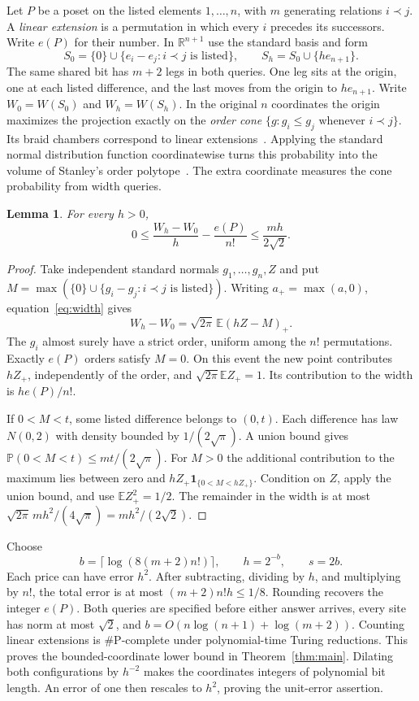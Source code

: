 \documentclass[11pt,letterpaper]{article}
\newtheorem{lemma}[theorem]{Lemma}
\theoremstyle{definition}
\newcommand{\E}{\mathbb E}
\newcommand{\R}{\mathbb R}
\newcommand{\Prob}{\mathbb P}
\newcommand{\sharpP}{\#\mathrm P}
\begin{document}
Let \(P\) be a poset on the listed elements \(1,\ldots,n\), with \(m\)
generating relations \(i\prec j\). A \emph{linear extension} is a permutation
in which every \(i\) precedes its successors. Write \(e(P)\) for their number.
In \(\R^{n+1}\) use the standard basis and form
\[
 S_0=\{0\}\cup\{e_i-e_j:i\prec j\text{ is listed}\},\qquad
 S_h=S_0\cup\{h e_{n+1}\}.
\]
The same shared bit has \(m+2\) legs in both queries. One leg sits at the
origin, one at each listed difference, and the last moves from the origin
to \(he_{n+1}\). Write \(W_0=W(S_0)\) and \(W_h=W(S_h)\).
In the original \(n\) coordinates the origin maximizes the projection
exactly on the \emph{order cone} \(\{g:g_i\le g_j\text{ whenever }i\prec j\}\).
Its braid chambers correspond to linear extensions~\cite[Section~2.4]{dbkr-poset-cones}. Applying the standard normal distribution function coordinatewise turns this probability into the volume of Stanley's order polytope~\cite[Corollary~4.2]{stanley-poset-polytopes}. The extra coordinate measures the cone probability from width queries.

\begin{lemma}\label{lem:lift}
For every \(h>0\),
\[
 0\le \frac{W_h-W_0}{h}-\frac{e(P)}{n!}\le \frac{mh}{2\sqrt2}.
\]
\end{lemma}
\begin{proof}
Take independent standard normals \(g_1,\ldots,g_n,Z\) and put
\(M=\max(\{0\}\cup\{g_i-g_j:i\prec j\text{ is listed}\})\).
Writing \(a_+=\max(a,0)\), equation~\eqref{eq:width} gives
\[
 W_h-W_0=\sqrt{2\pi}\,\E(hZ-M)_+ .
\]
The \(g_i\) almost surely have a strict order, uniform among the \(n!\)
permutations. Exactly \(e(P)\) orders satisfy \(M=0\). On this event the
new point contributes \(hZ_+\), independently of the order, and
\(\sqrt{2\pi}\E Z_+=1\). Its contribution to the width is \(h e(P)/n!\).

If \(0<M<t\), some listed difference belongs to \((0,t)\).
Each difference has law \(N(0,2)\) with density bounded by
\(1/(2\sqrt\pi)\). A union bound gives
\(\Prob(0<M<t)\le mt/(2\sqrt\pi)\). For \(M>0\) the additional contribution
to the maximum lies between zero and
\(hZ_+\mathbf1_{\{0<M<hZ_+\}}\). Condition on \(Z\), apply the union
bound, and use \(\E Z_+^2=1/2\). The remainder in the width is at most
\(\sqrt{2\pi}\,mh^2/(4\sqrt\pi)=mh^2/(2\sqrt2)\).
\end{proof}

Choose
\[
 b=\lceil\log(8(m+2)n!)\rceil,\qquad h=2^{-b},\qquad s=2b .
\]
Each price can have error \(h^2\). After subtracting, dividing by \(h\),
and multiplying by \(n!\), the total error is at most
\((m+2)n!h\le1/8\). Rounding recovers the integer \(e(P)\). Both queries
are specified before either answer arrives, every site has norm at most
\(\sqrt2\), and \(b=O(n\log(n+1)+\log(m+2))\). Counting linear extensions
is \(\sharpP\)-complete under polynomial-time Turing reductions. This
proves the bounded-coordinate lower bound in Theorem~\ref{thm:main}.
Dilating both configurations by \(h^{-2}\) makes the coordinates integers
of polynomial bit length. An error of one then rescales to \(h^2\), proving
the unit-error assertion. \cite{brightwell-winkler-extensions}
\end{document}
